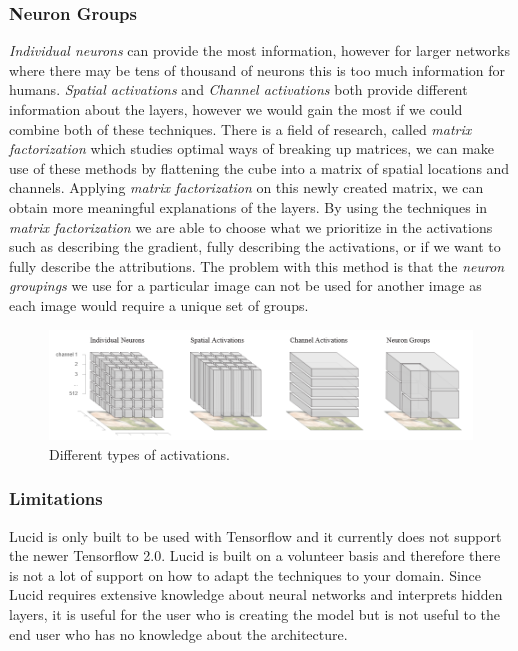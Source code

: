\subsubsection{Neuron Groups}
\emph{Individual neurons} can provide the most information, however for larger networks where there may be tens of thousand of neurons this is too much information for humans. \emph{Spatial activations} and \emph{Channel activations} both provide different information about the layers, however we would gain the most if we could combine both of these techniques. There is a field of research, called \emph{matrix factorization} which studies optimal ways of breaking up matrices, we can make use of these methods by flattening the cube into a matrix of spatial locations and channels. Applying \emph{matrix factorization} on this newly created matrix, we can obtain more meaningful explanations of the layers.  By using the techniques in \emph{matrix factorization} we are able to choose what we prioritize in the activations such as describing the gradient, fully describing the activations, or if we want to fully describe the attributions. The problem with this method is that the \emph{neuron groupings} we use for a particular image can not be used for another image as each image would require a unique set of groups. 
\begin  {figure}[!htpb]
  \includegraphics[width=\linewidth]{Evaluation_Images/LUCID_maps.png}
  \caption{Different types of activations. \cite{olah2018the}}
  \label{fig:lucid-maps}
\end{figure}




\subsubsection{Limitations}
Lucid is only built to be used with Tensorflow and it currently does not support the newer Tensorflow 2.0. Lucid is built on a volunteer basis and therefore there is not a lot of support on how to adapt the techniques to your domain. Since Lucid requires extensive knowledge about neural networks and interprets hidden layers, it is useful for the user who is creating the model but is not useful to the end user who has no knowledge about the architecture.
